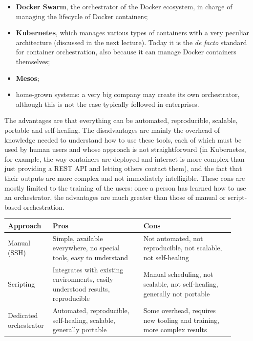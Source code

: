 \begin{itemize}
\item \textbf{Docker Swarm}, the orchestrator of the Docker ecosystem, in charge of managing the lifecycle of Docker containers;
\item \textbf{Kubernetes}, which manages various types of containers with a very peculiar architecture (discussed in the next lecture). Today it is the \emph{de facto} standard for container orchestration, also because it can manage Docker containers themselves;
\item \textbf{Mesos};
\item home-grown systems: a very big company may create its own orchestrator, although this is not the case typically followed in enterprises.
\end{itemize}

The advantages are that everything can be automated, reproducible, scalable, portable and self-healing. The disadvantages are mainly the overhead of knowledge needed to understand how to use these tools, each of which must be used by human users and whose approach is not straightforward (in Kubernetes, for example, the way containers are deployed and interact is more complex than just providing a REST API and letting others contact them), and the fact that their outputs are more complex and not immediately intelligible. These cons are mostly limited to the training of the users: once a person has learned how to use an orchestrator, the advantages are much greater than those of manual or script-based orchestration.

\begin{center}
\small
\begin{tabular}{@{}>{\raggedright\arraybackslash}p{0.16\linewidth}>{\raggedright\arraybackslash}p{0.38\linewidth}>{\raggedright\arraybackslash}p{0.38\linewidth}@{}}
\toprule
\textbf{Approach} & \textbf{Pros} & \textbf{Cons}\\
\midrule
Manual (SSH) & Simple, available everywhere, no special tools, easy to understand & Not automated, not reproducible, not scalable, not self-healing\\
Scripting & Integrates with existing environments, easily understood results, reproducible & Manual scheduling, not scalable, not self-healing, generally not portable\\
Dedicated orchestrator & Automated, reproducible, self-healing, scalable, generally portable & Some overhead, requires new tooling and training, more complex results\\
\bottomrule
\end{tabular}
\end{center}

